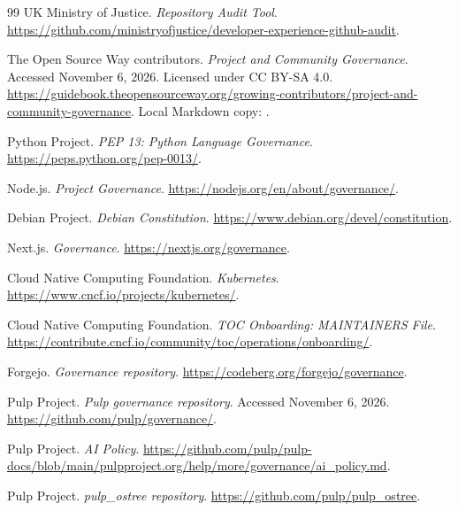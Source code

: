 \documentclass[11pt]{article}
\begin{document}
\begin{thebibliography}{99}
  UK Ministry of Justice. \emph{Repository Audit Tool}.
  \url{https://github.com/ministryofjustice/developer-experience-github-audit}.

  The Open Source Way contributors. \emph{Project and Community Governance}.
  Accessed November 6, 2026. Licensed under CC BY-SA 4.0.
  \url{https://guidebook.theopensourceway.org/growing-contributors/project-and-community-governance}.
  Local Markdown copy: .

  Python Project. \emph{PEP 13: Python Language Governance}.
  \url{https://peps.python.org/pep-0013/}.

  Node.js. \emph{Project Governance}.
  \url{https://nodejs.org/en/about/governance/}.

  Debian Project. \emph{Debian Constitution}.
  \url{https://www.debian.org/devel/constitution}.

  Next.js. \emph{Governance}.
  \url{https://nextjs.org/governance}.

  Cloud Native Computing Foundation. \emph{Kubernetes}.
  \url{https://www.cncf.io/projects/kubernetes/}.

  Cloud Native Computing Foundation. \emph{TOC Onboarding: MAINTAINERS File}.
  \url{https://contribute.cncf.io/community/toc/operations/onboarding/}.

  Forgejo. \emph{Governance repository}.
  \url{https://codeberg.org/forgejo/governance}.

  Pulp Project. \emph{Pulp governance repository}. Accessed November 6, 2026.
  \url{https://github.com/pulp/governance/}.

  Pulp Project. \emph{AI Policy}.
  \url{https://github.com/pulp/pulp-docs/blob/main/pulpproject.org/help/more/governance/ai_policy.md}.

  Pulp Project. \emph{pulp\_ostree repository}.
  \url{https://github.com/pulp/pulp_ostree}.
\end{thebibliography}
\end{document}
